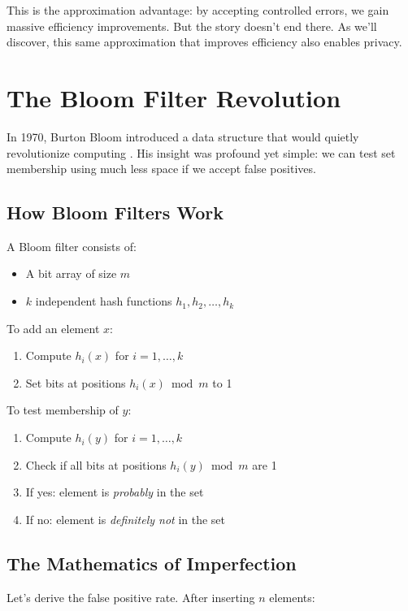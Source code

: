 This is the approximation advantage: by accepting controlled errors, we gain massive efficiency improvements. But the story doesn't end there. As we'll discover, this same approximation that improves efficiency also enables privacy.

\section{The Bloom Filter Revolution}

In 1970, Burton Bloom introduced a data structure that would quietly revolutionize computing \cite{bloom1970}. His insight was profound yet simple: we can test set membership using much less space if we accept false positives.

\subsection{How Bloom Filters Work}

A Bloom filter consists of:
\begin{itemize}
    \item A bit array of size $m$
    \item $k$ independent hash functions $h_1, h_2, \ldots, h_k$
\end{itemize}

To add an element $x$:
\begin{enumerate}
    \item Compute $h_i(x)$ for $i = 1, \ldots, k$
    \item Set bits at positions $h_i(x) \bmod m$ to 1
\end{enumerate}

To test membership of $y$:
\begin{enumerate}
    \item Compute $h_i(y)$ for $i = 1, \ldots, k$
    \item Check if all bits at positions $h_i(y) \bmod m$ are 1
    \item If yes: element is \emph{probably} in the set
    \item If no: element is \emph{definitely not} in the set
\end{enumerate}

\subsection{The Mathematics of Imperfection}

Let's derive the false positive rate. After inserting $n$ elements:

